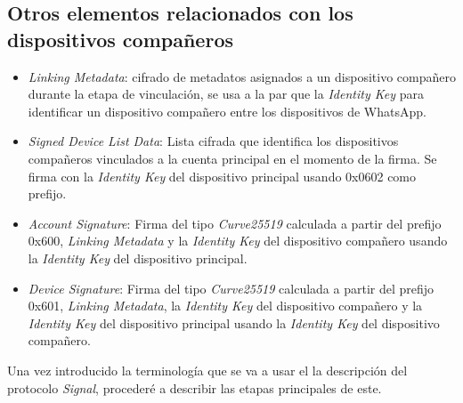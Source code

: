 \subsection{Otros elementos relacionados con los dispositivos compañeros}
\begin{itemize}
	\item \emph{Linking Metadata}: cifrado de metadatos asignados a un dispositivo compañero durante la etapa de vinculación, se usa a la par que la \emph{Identity Key} para identificar un dispositivo compañero entre los dispositivos de WhatsApp.
	\item \emph{Signed Device List Data}: Lista cifrada que identifica los dispositivos compañeros vinculados a la cuenta principal en el momento de la firma. Se firma con la \emph{Identity Key} del dispositivo principal usando 0x0602 como prefijo.
	\item \emph{Account Signature}: Firma del tipo \emph{Curve25519} calculada a partir del prefijo 0x600, \emph{Linking Metadata} y la \emph{Identity Key} del dispositivo compañero usando la \emph{Identity Key} del dispositivo principal.
	\item \emph{Device Signature}: Firma del tipo \emph{Curve25519} calculada a partir del prefijo 0x601, \emph{Linking Metadata}, la \emph{Identity Key} del dispositivo compañero y la \emph{Identity Key} del dispositivo principal usando la \emph{Identity Key} del dispositivo compañero. 
\end{itemize}

Una vez introducido la terminología que se va a usar el la descripción del protocolo \emph{Signal}, procederé a describir las etapas principales de este.\\

